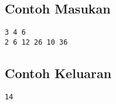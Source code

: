 \documentclass{article}
\begin{document}
\begin{multicols}{2}
\subsection*{Contoh Masukan}
\begin{lstlisting}
3 4 6
2 6 12 26 10 36
\end{lstlisting}
\columnbreak
\subsection*{Contoh Keluaran}
\begin{lstlisting}
14
\end{lstlisting}
\vfill
\null
\end{multicols}

\pagebreak
\end{document}
